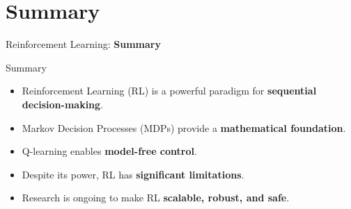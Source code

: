 \section{Summary}
\begin{frame}{}
    \LARGE Reinforcement Learning: \textbf{Summary}
\end{frame}

\begin{frame}{Summary}
    \begin{itemize}
        \item Reinforcement Learning (RL) is a powerful paradigm for \textbf{sequential decision-making}.
        \item Markov Decision Processes (MDPs) provide a \textbf{mathematical foundation}.
        \item Q-learning enables \textbf{model-free control}.
        \item Despite its power, RL has \textbf{significant limitations}.
        \item Research is ongoing to make RL \textbf{scalable, robust, and safe}.
    \end{itemize}
\end{frame}